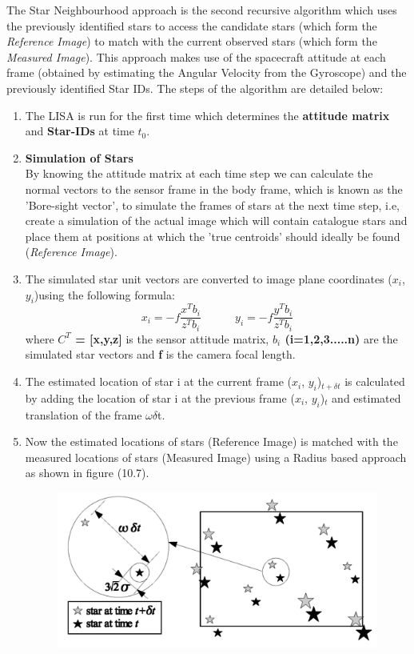 \documentclass[../../main.tex]{subfiles}
\begin{document}
\begin{itemize}
    The Star Neighbourhood approach is the second recursive algorithm which uses the previously identified stars to access the candidate stars (which form the \textit{Reference Image}) to match with the current observed stars (which form the \textit{Measured Image}). This approach makes use of the spacecraft attitude at each frame (obtained by estimating the Angular Velocity from the Gyroscope) and the previously identified Star IDs. The steps of the algorithm are detailed below:
    \begin{enumerate}
        \item The LISA is run for the first time which determines the \textbf{attitude matrix} and \textbf{Star-IDs} at time $t_{0}$.
        \item \textbf{Simulation of Stars}\\
        By knowing the attitude matrix at each time step we can calculate the normal vectors to the sensor frame in the body frame, which is known as the 'Bore-sight vector', to simulate the frames of stars at the next time step, i.e, create a simulation of the actual image which will contain catalogue stars and place them at positions at which the 'true centroids' should ideally be found (\textit{Reference Image}).
        \item The simulated star unit vectors are converted to image plane coordinates ($x_{i}$, $y_{i}$)using the following formula:
        \begin{equation}
            x_{i} = -f\frac{x^{T}b_{i}}{z^{T}b_{i}} \hspace{3em} y_{i} = -f\frac{y^{T}b_{i}}{z^{T}b_{i}}
        \end{equation}
        where \textbf{$C^{T}$ = [x,y,z]} is the sensor attitude matrix, \textbf{$b_{i}$ (i=1,2,3.....n)} are the simulated star vectors and \textbf{f} is the camera focal length. 
        \item The estimated location of star i at the current frame ($x_{i}$, $y_{i}$)$_{t+\delta t}$ is calculated by adding the location of star i at the previous frame ($x_{i}$, $y_{i}$)$_{t}$ and estimated translation of the frame $\omega\delta$t.
        \item Now the estimated locations of stars (Reference Image) is matched with the measured locations of stars (Measured Image) using a Radius based approach as shown in figure (10.7). 
        \begin{figure}[!h]
        \centering
        \includegraphics[scale=0.20]{Figures/GNC/radius_matching.png}

\end{figure}
\end{enumerate}
\end{itemize}
\end{document}

